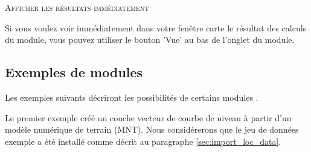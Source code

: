 \begin{Tip}\caption{\textsc{Afficher les résultats immédiatement}}
Si vous voulez voir immédiatement dans votre fenêtre carte le résultat des calculs du module, vous pouvez utiliser le bouton 'Vue' au bas de l'onglet du module.
\end{Tip} 

\subsection{Exemples de modules \grass }
Les exemples suivants décriront les possibilités de certains modules \grass.


Le premier exemple créé un couche vecteur de courbe de niveau à partir d'un modèle numérique de terrain (MNT). Nous considérerons que le jeu de données exemple  a été installé comme décrit au paragraphe \ref{sec:import_loc_data}.

